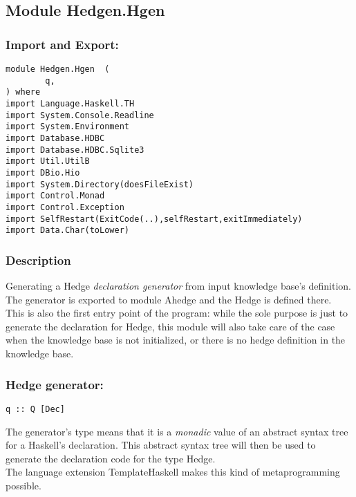 \documentclass[../gr-final.tex]{subfiles}
\begin{document}
\subsection{Module Hedgen.Hgen}
\subsubsection{Import and Export:}

\begin{lstlisting}
module Hedgen.Hgen  (
        q,
) where
import Language.Haskell.TH
import System.Console.Readline
import System.Environment
import Database.HDBC
import Database.HDBC.Sqlite3
import Util.UtilB
import DBio.Hio
import System.Directory(doesFileExist)
import Control.Monad
import Control.Exception
import SelfRestart(ExitCode(..),selfRestart,exitImmediately)
import Data.Char(toLower) 
\end{lstlisting}        
\subsubsection {Description} Generating a Hedge {\em declaration generator} from input knowledge
base's definition. The generator is exported to module Ahedge and
the Hedge is defined there.\\
This is also the first entry point of the program: while the sole
purpose is just to generate the declaration for Hedge, this
module will also take care of the case when the knowledge base is
not initialized, or there is no hedge definition in the knowledge
base.
\subsubsection{Hedge generator:}
\begin{lstlisting}
q :: Q [Dec]
\end{lstlisting}
The generator's type means that it is a {\em monadic} value of
an abstract syntax tree for a Haskell's declaration. This
abstract syntax tree will then be used to generate the
declaration code for the type Hedge.\\
The language extension TemplateHaskell makes this kind of metaprogramming
possible.
\end{document}
